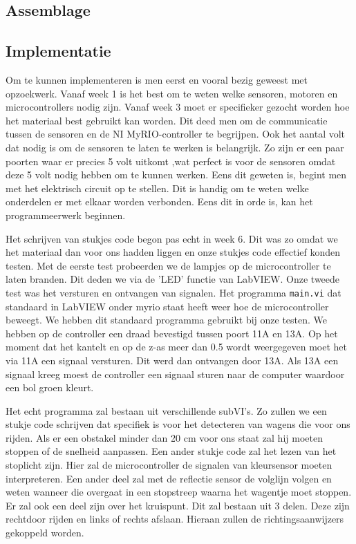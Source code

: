 \documentclass[a4paper,twoside,kulak]{kulakreport} %
\begin{document}
\subsection{Assemblage}


\subsection{Implementatie}


Om te kunnen implementeren is men eerst en vooral bezig geweest met opzoekwerk. Vanaf week 1 is het best om te weten welke sensoren, motoren en microcontrollers nodig zijn. Vanaf week 3 moet er specifieker gezocht worden hoe het materiaal best gebruikt kan worden. 
Dit deed men om de communicatie tussen de sensoren en de NI MyRIO-controller te begrijpen. Ook het aantal volt dat nodig is om de sensoren te laten te werken is belangrijk. Zo zijn er een paar poorten waar er precies 5 volt uitkomt ,wat perfect is voor de sensoren omdat deze 5 volt nodig hebben om te kunnen werken. Eens dit geweten is, begint men met het elektrisch circuit op te stellen. Dit is handig om te weten welke onderdelen er met elkaar worden verbonden. Eens dit in orde is, kan het programmeerwerk beginnen.

Het schrijven van stukjes code begon pas echt in week 6. Dit was zo omdat we het materiaal dan voor ons hadden liggen en onze stukjes code effectief konden testen. Met de eerste test probeerden we de lampjes op de microcontroller te laten branden. Dit deden we via de 'LED' functie van LabVIEW. Onze tweede test was het versturen en ontvangen van signalen. Het programma \texttt{main.vi} dat standaard in LabVIEW onder myrio staat heeft weer hoe de microcontroller beweegt. We hebben dit standaard programma gebruikt bij onze testen. We hebben op de controller een draad bevestigd tussen poort 11A en 13A. Op het moment dat het kantelt en op de z-as meer dan 0.5 wordt weergegeven moet het via 11A een signaal versturen. Dit werd dan ontvangen door 13A. Als 13A een signaal kreeg moest de controller een signaal sturen naar de computer waardoor een bol groen kleurt. 

Het echt programma zal bestaan uit verschillende subVI's. Zo zullen we een stukje code schrijven dat specifiek is voor het detecteren van wagens die voor ons rijden. Als er een obstakel minder dan 20 cm voor ons staat zal hij moeten stoppen of de snelheid aanpassen. Een ander stukje code zal het lezen van het stoplicht zijn. Hier zal de microcontroller de signalen van kleursensor moeten interpreteren. Een ander deel zal met de reflectie sensor de volglijn volgen en weten wanneer die overgaat in een stopstreep waarna het wagentje moet stoppen.
Er zal ook een deel zijn over het kruispunt. Dit zal bestaan uit 3 delen. Deze zijn rechtdoor rijden en links of rechts afslaan. Hieraan zullen de richtingsaanwijzers gekoppeld worden. 
\end{document}
